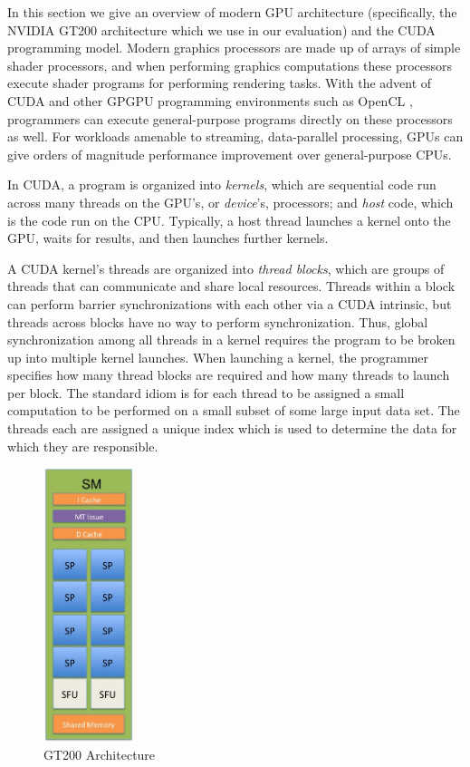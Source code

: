\documentclass[preprint]{sigplanconf}
\begin{document}
In this section we give an overview of modern GPU architecture (specifically, the NVIDIA GT200 architecture which we use in our evaluation) and the CUDA programming model.  Modern graphics processors are made up of arrays of simple shader processors, and when performing graphics computations these processors execute shader programs for performing rendering tasks.  With the advent of CUDA and other GPGPU programming environments such as OpenCL \cite{Muns08}, programmers can execute general-purpose programs directly on these processors as well.  For workloads amenable to streaming, data-parallel processing, GPUs can give orders of magnitude performance improvement over general-purpose CPUs.

In CUDA, a program is organized into {\it kernels}, which are sequential code run across many threads on the GPU's, or {\it device}'s, processors; and {\it host} code, which is the code run on the CPU.  Typically, a host thread launches a kernel onto the GPU, waits for results, and then launches further kernels.

A CUDA kernel's threads are organized into {\it thread blocks}, which are groups of threads that can communicate and share local resources.  Threads within a block can perform barrier synchronizations with each other via a CUDA intrinsic, but threads across blocks have no way to perform synchronization.  Thus, global synchronization among all threads in a kernel requires the program to be broken up into multiple kernel launches.  When launching a kernel, the programmer specifies how many thread blocks are required and how many threads to launch per block.  The standard idiom is for each thread to be assigned a small computation to be performed on a small subset of some large input data set.  The threads each are assigned a unique index which is used to determine the data for which they are responsible.

\begin{figure}
\includegraphics[height=80mm]{GPUdiagram1.jpg}
\caption{GT200 Architecture}
\label{GPUdiagram}
\end{figure}
\end{document}
